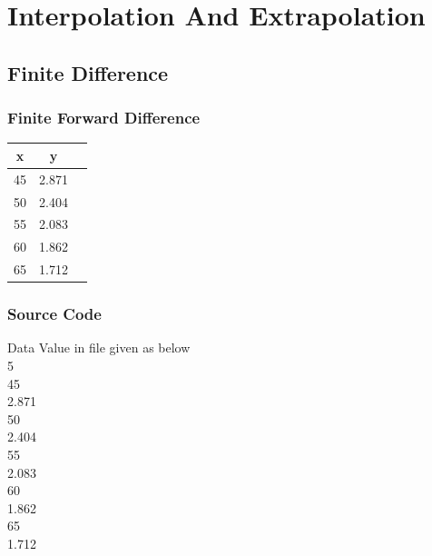 \documentclass{article}
\begin{document}
\section{Interpolation And Extrapolation}
\subsection{Finite Difference}
\subsubsection{Finite Forward Difference}
\begin{center}
\begin{tabular}{ |c|c|c| } 
\hline
 x & y\\
 \hline
 45 & 2.871  \\  \hline
 50 & 2.404  \\  \hline
 55 & 2.083 \\  \hline
 60 & 1.862  \\  \hline
 65 & 1.712 \\  \hline
 
 \hline
\end{tabular}
\end{center}
\subsubsection{Source Code}
Data Value in file given as below\\
5\\
45\\
2.871\\
50\\
2.404\\
55\\
2.083\\
60\\
1.862\\
65\\
1.712\\
\end{document}
